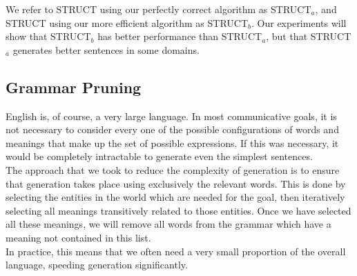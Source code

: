 We refer to STRUCT using our perfectly correct algorithm as STRUCT$_a$, and STRUCT
using our more efficient algorithm as STRUCT$_b$.  Our experiments will show that STRUCT$_b$
has better performance than STRUCT$_a$, but that STRUCT$_a$ generates better
sentences in some domains.

\subsection{Grammar Pruning}

English is, of course, a very large language.  In most communicative goals, it is
not necessary to consider every one of the possible configurations of words and
meanings that make up the set of possible expressions.  If this was necessary,
it would be completely intractable to generate even the simplest sentences.\\

The approach that we took to reduce the complexity of generation is to ensure that
generation takes place using exclusively the relevant words.  This is done by selecting
the entities in the world which are needed for the goal, then iteratively selecting all
meanings transitively related to those entities.  Once we have selected all these meanings,
we will remove all words from the grammar which have a meaning not contained in this list.\\

In practice, this means that we often need a very small proportion of the overall language,
speeding generation significantly.